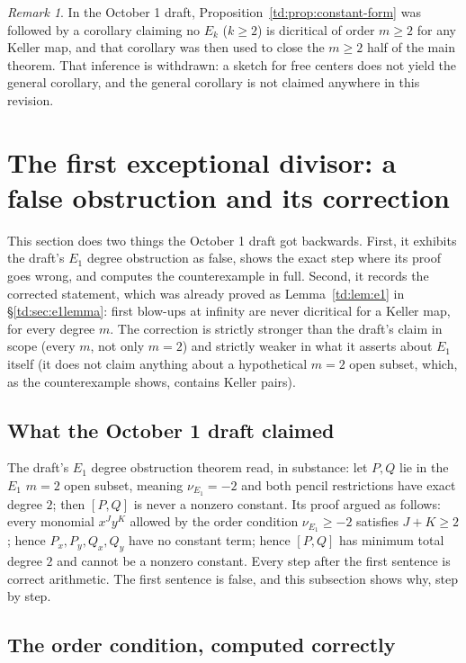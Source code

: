\documentclass[a4paper,11pt]{article}
\theoremstyle{plain}
\theoremstyle{definition}
\theoremstyle{remark}
\newtheorem{remark}[theorem]{Remark}
\begin{document}
\begin{remark}
In the October 1 draft, Proposition~\ref{td:prop:constant-form} was followed by a corollary
claiming no $E_k$ ($k \geq 2$) is dicritical of order $m \geq 2$ for any Keller map, and that
corollary was then used to close the $m \geq 2$ half of the main theorem. That inference is
withdrawn: a sketch for free centers does not yield the general corollary, and the general
corollary is not claimed anywhere in this revision.
\end{remark}

\section{The first exceptional divisor: a false obstruction and its correction}\label{td:sec:e1}

This section does two things the October 1 draft got backwards. First, it exhibits the draft's
$E_1$ degree obstruction as false, shows the exact step where its proof goes wrong, and
computes the counterexample in full. Second, it records the corrected statement, which was
already proved as Lemma~\ref{td:lem:e1} in \S\ref{td:sec:e1lemma}: first blow-ups at infinity are
never dicritical for a Keller map, for every degree $m$. The correction is strictly stronger
than the draft's claim in scope (every $m$, not only $m = 2$) and strictly weaker in what it
asserts about $E_1$ itself (it does not claim anything about a hypothetical $m = 2$ open
subset, which, as the counterexample shows, contains Keller pairs).

\subsection{What the October 1 draft claimed}

The draft's $E_1$ degree obstruction theorem read, in substance: let
$P, Q$ lie in the $E_1$ $m = 2$ open subset, meaning $\nu_{E_1} = -2$ and both pencil
restrictions have exact degree $2$; then $[P,Q]$ is never a nonzero constant. Its proof argued
as follows: every monomial $x^J y^K$ allowed by the order condition $\nu_{E_1} \geq -2$
satisfies $J + K \geq 2$; hence $P_x, P_y, Q_x, Q_y$ have no constant term; hence $[P,Q]$ has
minimum total degree $2$ and cannot be a nonzero constant. Every step after the first
sentence is correct arithmetic. The first sentence is false, and this subsection shows why,
step by step.

\subsection{The order condition, computed correctly}
\end{document}
